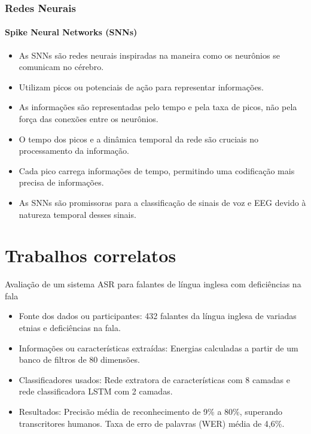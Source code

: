 \documentclass{beamer}
\begin{document}
	\begin{frame}
		\frametitle{Redes Neurais}
		\framesubtitle{Spike Neural Networks (SNNs)}
		\begin{itemize}
			\item As SNNs são redes neurais inspiradas na maneira como os neurônios se comunicam no cérebro.
			\item Utilizam picos ou potenciais de ação para representar informações.
			\item As informações são representadas pelo tempo e pela taxa de picos, não pela força das conexões entre os neurônios.
			\item O tempo dos picos e a dinâmica temporal da rede são cruciais no processamento da informação.
			\item Cada pico carrega informações de tempo, permitindo uma codificação mais precisa de informações.
			\item As SNNs são promissoras para a classificação de sinais de voz e EEG devido à natureza temporal desses sinais.
		\end{itemize}
	\end{frame}

	\section{Trabalhos correlatos}
	
	\begin{frame}{Avaliação de um sistema ASR para falantes de língua inglesa com deficiências na fala \cite{WOS:000841879504172}}
		\begin{itemize}
			\item Fonte dos dados ou participantes: 432 falantes da língua inglesa de variadas etnias e deficiências na fala.
			\item Informações ou características extraídas: Energias calculadas a partir de um banco de filtros de 80 dimensões.
			\item Classificadores usados: Rede extratora de características com 8 camadas e rede classificadora LSTM com 2 camadas.
			\item Resultados: Precisão média de reconhecimento de 9\% a 80\%, superando transcritores humanos. Taxa de erro de palavras (WER) média de 4,6\%.
		\end{itemize}
		
	\end{frame}
\end{document}
